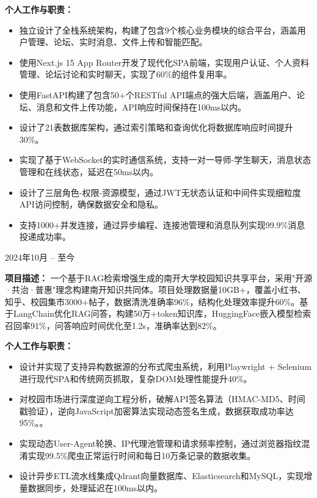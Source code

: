 \documentclass{resume}
\begin{document}
\textbf{个人工作与职责：}
\begin{itemize}
    \item 独立设计了全栈系统架构，构建了包含9个核心业务模块的综合平台，涵盖用户管理、论坛、实时消息、文件上传和智能匹配。
    \item 使用Next.js 15 App Router开发了现代化SPA前端，实现用户认证、个人资料管理、论坛讨论和实时聊天，实现了60\%的组件复用率。
    \item 使用FastAPI构建了包含50+个RESTful API端点的强大后端，涵盖用户、论坛、消息和文件上传功能，API响应时间保持在100ms以内。
    \item 设计了21表数据库架构，通过索引策略和查询优化将数据库响应时间提升30\%。
    \item 实现了基于WebSocket的实时通信系统，支持一对一导师-学生聊天，消息状态管理和在线状态，延迟在50ms以内。
    \item 设计了三层角色-权限-资源模型，通过JWT无状态认证和中间件实现细粒度API访问控制，确保数据安全和隐私。
    \item 支持1000+并发连接，通过异步编程、连接池管理和消息队列实现99.9\%消息投递成功率。

\end{itemize}

 {2024年10月 -- 至今}

\textbf{项目描述：}
一个基于RAG检索增强生成的南开大学校园知识共享平台，采用"开源·共治·普惠"理念构建南开知识共同体。项目处理数据量10GB+，覆盖小红书、知乎、校园集市3000+帖子，数据清洗准确率96\%，结构化处理效率提升60\%。基于LangChain优化RAG问答，构建50万+token知识库，HuggingFace嵌入模型检索召回率91\%，问答响应时间优化至1.2s，准确率达到82\%。

\textbf{个人工作与职责：}
\begin{itemize}
    \item 设计并实现了支持异构数据源的分布式爬虫系统，利用Playwright + Selenium进行现代SPA和传统网页抓取，复杂DOM处理性能提升40\%。
    \item 对校园市场进行深度逆向工程分析，破解API签名算法（HMAC-MD5、时间戳验证），逆向JavaScript加密算法实现动态签名生成，数据获取成功率达95\%。。
    \item 实现动态User-Agent轮换、IP代理池管理和请求频率控制，通过浏览器指纹混淆实现99.5\%爬虫正常运行时间和每日10万条记录的数据收集。
    \item 设计异步ETL流水线集成Qdrant向量数据库、Elasticsearch和MySQL，实现增量数据同步，处理延迟在100ms以内。
\end{itemize}
\end{document}
